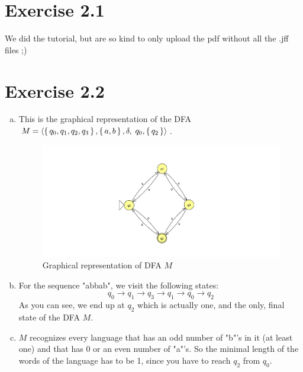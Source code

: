 \documentclass{article} %
\newcommand{\homeworkNumber}{2}
\begin{document}
\section*{Exercise \homeworkNumber.1}
We did the tutorial, but are so kind to only upload the pdf without all the
.jff files ;)

\section*{Exercise \homeworkNumber.2}
\begin{enumerate}[(a)]
	\item
	This is the graphical representation of the DFA $M = \left \langle
		\set{q_0, q_1, q_2, q_3}, \set{a, b}, \delta,\; q_0, \set{q_2}
		\right \rangle$.
	\begin{figure}[H]
		\includegraphics[width=\linewidth]{ex2a.png}
		\centering
		\caption{Graphical representation of DFA $M$}
	\end{figure}

	\item
	For the sequence "abbab", we visit the following states:
	$$
	q_0 \to q_1 \to q_3 \to q_1 \to q_0 \to q_2
	$$
	As you can see, we end up at $q_2$ which is actually one, and the only, final state of the DFA $M$.

	\item
	$M$ recognizes every language that has an odd number of "b"'s in it (at least one) and that has 0 or
	an even number of "a"'s. So the minimal length of the words of the language has to be 1, since you have to reach $q_2$ from $q_0$.

\end{enumerate}

\clearpage
\end{document}
